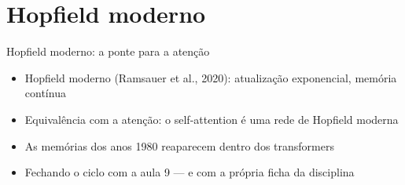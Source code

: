 \documentclass[aspectratio=169, 11pt]{beamer}
\begin{document}
\section{Hopfield moderno}

\begin{frame}{Hopfield moderno: a ponte para a atenção}
  \begin{itemize}\setlength{\itemsep}{0.4ex}
    \item Hopfield moderno (Ramsauer et al., 2020): atualização exponencial,
          memória contínua
    \item Equivalência com a atenção: o self-attention é uma rede de Hopfield
          moderna
    \item As memórias dos anos 1980 reaparecem dentro dos transformers
    \item Fechando o ciclo com a aula 9 — e com a própria ficha da
          disciplina
  \end{itemize}
\end{frame}
\end{document}
